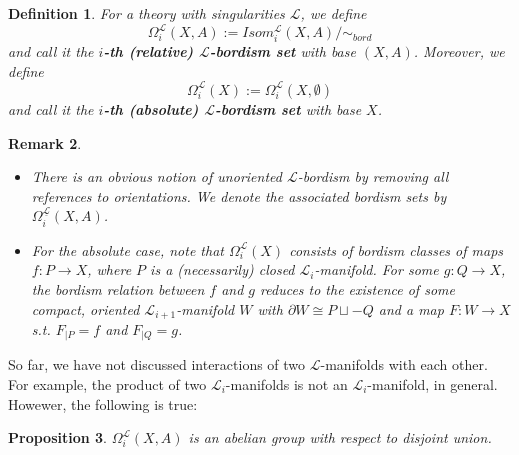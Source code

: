 \documentclass{scrreprt}
\newtheorem{prop}{Proposition}[chapter]
\newtheorem{definition}[prop]{Definition}
\newtheorem{remark}[prop]{Remark}
\begin{document}
\begin{definition}\label{bordismgroup}
For a theory with singularities $\mathcal{L}$, we define  
\begin{equation*}
\Omega_i^\mathcal{L}(X,A):= Isom_i^\mathcal{L}(X,A)/ \sim_{bord}
\end{equation*}
 and call it the \textbf{$i$-th (relative) $\mathcal{L}$-bordism set} with base $(X,A)$. Moreover, we define
\begin{equation*}
\Omega_i^\mathcal{L}(X):=\Omega_i^\mathcal{L}(X, \emptyset)
\end{equation*}
and call it the \textbf{$i$-th (absolute) $\mathcal{L}$-bordism set} with base $X$.
\end{definition}

\begin{remark}
\begin{itemize}
\item[1.] There is an obvious notion of unoriented $\mathcal{L}$-bordism by removing all references to orientations. We denote the associated bordism sets by $\Omega_i^{\underline{\mathcal{L}}}(X,A)$.
\item[2.] For the absolute case, note that $\Omega_i^{\mathcal{L}}(X)$ consists of bordism classes of maps \\ $f: P \to X$, where $P$ is a (necessarily) closed $\mathcal{L}_i$-manifold. For some $g: Q \to X$, the bordism relation between $f$ and $g$ reduces to the existence of some compact, oriented $\mathcal{L}_{i+1}$-manifold $W$ with $\partial W \cong P \sqcup -Q$ and a map $F: W \to X$ s.t. $F_{|P}=f$ and $F_{|Q}=g$.
\end{itemize}
\end{remark}

So far, we have not discussed interactions of two $\mathcal{L}$-manifolds with each other. For example, the product of two $\mathcal{L}_i$-manifolds is not an $\mathcal{L}_i$-manifold, in general. Howewer, the following is true:

\begin{prop}
$\Omega_i^{\mathcal{L}}(X,A)$ is an abelian group with respect to disjoint union.
\end{prop}
\end{document}

